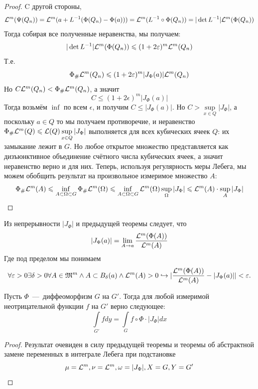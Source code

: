 \begin{proof}
    C другой стороны, \[\mathcal{L}^m(\Psi(Q_n)) = \mathcal{L}^m(a + L^{-1}(\Phi(Q_n) - \Phi(a))) = \mathcal{L}^m(L^{-1}\circ\Phi(Q_n)) = |\det L^{-1}| \mathcal{L}^m(\Phi(Q_n))\]
    Тогда собирая все полученные неравенства, мы получаем: \[|\det L^{-1}|\mathcal{L}^m(\Phi(Q_n)) \leqslant (1 + 2\varepsilon)^m \mathcal{L}^m(Q_n)\]
    Т.е. \[\Phi_\#\mathcal{L}^m(Q_n) \leqslant (1 + 2\varepsilon)^m|J_\Phi(a)|\mathcal{L}^m(Q_n)\]
    Но $C\mathcal{L}^m(Q_n) < \Phi_{\#}\mathcal{L}^m(Q_n)$, а значит \[C \leq (1 + 2\epsilon)^m|J_\Phi(a)|\]
    Тогда возьмём $\inf$ по всем $\epsilon$, и получим $C \leq |J_\Phi(a)|$. Но $C > \sup\limits_{x \in Q} |J_\Phi|$, а поскольку $a \in Q$ то мы получаем противоречие, и неравенство $\Phi_\#\mathcal{L}^m(Q) \leqslant \mathcal{L}(Q)\sup\limits_{x \in Q} |J_\Phi|$ выполняется для всех кубических ячеек $Q$: их замыкание лежит в $G$. Но любое открытое множество представляется как дизъюнктивное объединение счётного числа кубических ячеек, а значит неравенство верно и для них. Теперь, используя регулярность меры Лебега, мы можем обобщить результат на произвольное измеримое множество $A$: \[\Phi_\#\mathcal{L}^m(A) \leqslant \inf\limits_{A \subset \Omega \subset G} \Phi_\#\mathcal{L}^m(\Omega) \leqslant \inf\limits_{A \subset \Omega \subset G} \mathcal{L}^m(\Omega) \sup\limits_\Omega |J_\Phi| \leqslant \mathcal{L}^m(A) \cdot \sup\limits_A |J_\Phi|\]
\end{proof}
\begin{corollary}
    Из непрерывности $|J_\Phi|$ и предыдущей теоремы следует, что \[|J_\Phi(a)| = \lim\limits_{A \rightarrow a} \dfrac{\mathcal{L}^m(\Phi(A))}{\mathcal{L}^m(A)}\]
    Где под пределом мы понимаем \[\forall \varepsilon > 0 \exists \delta > 0 \forall A \in \mathfrak{M}^m \wedge A \subset B_\delta(a) \wedge \mathcal{L}^m(A) > 0 \hookrightarrow |\frac{\mathcal{L}^m(\Phi(A))}{\mathcal{L}^m(A)} - |J_\Phi(a)|| < \varepsilon.\]
\end{corollary}
\begin{theorem}
    Пусть $\Phi$~---~диффеоморфизм $G$ на $G'$. Тогда для любой измеримой неотрицательной функции $f$ на $G'$ верно следующее: \[\int\limits_{G'} fdy = \int\limits_G f \circ \Phi \cdot |J_\Phi|dx\]
\end{theorem}
\begin{proof}
    Результат очевиден в силу предыдущей теоремы и теоремы об абстрактной замене переменных в интеграле Лебега при подстановке \[\mu = \mathcal{L}^m, \nu = \mathcal{L}^m, \omega = |J_\Phi|, X = G, Y = G'\]
\end{proof}